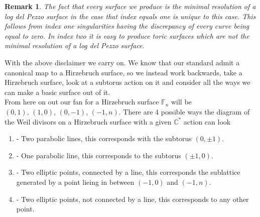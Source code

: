 \documentclass[11pt]{amsart}
\theoremstyle{plain}
\newtheorem*{rem}{Remark}
\begin{document}
\begin{rem}
The fact that every surface we produce is the minimal resolution of a log del Pezzo surface in the case that index equals one is unique to this case. This follows from index one singularities having the discrepancy of every curve being equal to zero. In index two it is easy to produce toric surfaces which are not the minimal resolution of a log del Pezzo surface.
\end{rem}


With the above disclaimer we carry on. We know that our standard admit a canonical map to a Hirzebruch surface, so we instead work backwards, take a Hirzebruch surface, look at a subtorus action on it and consider all the ways we can make a basic surface out of it.
\\
From here on out our fan for a Hirzebruch surface $\mathbb{F}_n$ will be $(0,1), \, (1,0), \, (0,-1), \, (-1, n)$. There are 4 possible ways the diagram of the Weil divisors on a Hirzebruch surface with a given $\mathbb{C}^*$ action can look
\begin{enumerate}[label =\Alph*]
\item - Two parabolic lines, this corresponds with the subtorus $(0, \pm 1)$.
\item - One parabolic line, this corresponds to the subtorus $(\pm 1, 0)$.
\item - Two elliptic points, connected by a line, this corresponds the sublattice generated by a point lieing in between $(-1,0)$ and $(-1, n)$.
\item - Two elliptic points, not connected by a line, this corresponds to any other point.
\end{enumerate} 

\begin{comment}
\begin{figure}[htbp]
\psset{unit=0.8cm}
\begin{pspicture}(0,-6)(18,0)
\psframe[linecolor=white](0.5,-6)(19,-1.5)

\psline[linecolor = blue]{-}(0.5, -4)(3.5, -4)
\psline{-}(1, -4.5)(1, -1.5)
\psline{-}(3, -4.5)(3, -1.5)
\psline[linecolor = blue]{-}(0.5, -2)(3.5, -2)

\psline{-}(5, -4)(8, -4)
\psline{-}(5.5, -4.5)(5.5, -1.5)
\psline[linecolor = blue]{-}(7.5, -4.5)(7.5, -1.5)
\psline{-}(5, -2)(8, -2)
\pscircle[fillcolor = red, fillstyle = solid](5.5, -2){0.15}


\psline{-}(9.5, -4)(12.5, -4)
\psline{-}(10, -4.5)(10, -1.5)
\psline{-}(12, -4.5)(12, -1.5)
\psline{-}(9.5, -2)(12.5, -2)
\pscircle[fillcolor = red, fillstyle = solid](10, -2){0.15}
\pscircle[fillcolor = red, fillstyle = solid](12, -2){0.15}

\psline{-}(14, -4)(17, -4)
\psline{-}(14.5, -4.5)(14.5, -1.5)
\psline{-}(16.5, -4.5)(16.5, -1.5)
\psline{-}(14, -2)(17, -2)
\pscircle[fillcolor = red, fillstyle = solid](14.5, -2){0.15}
\pscircle[fillcolor = red, fillstyle = solid](16.5, -4){0.15}

\end{pspicture}
\caption{The possible fibers in the theorem.}
\end{figure}
\end{comment}
\end{document}
